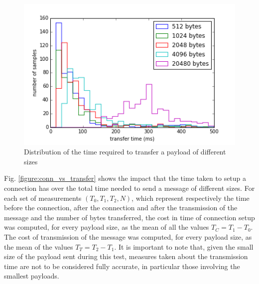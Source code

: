 \begin{figure}[ht!]
  \centering
  \includegraphics[width=1.0\textwidth]{application/img/transfer-time-distribution.png}
  \caption{Distribution of the time required to transfer a payload of different sizes}
  \label{figure:transfer_time_distribution}
\end{figure}

Fig. \ref{figure:conn_vs_transfer} shows the impact that the time taken to setup a connection has over the total time needed to send a message of different sizes.
For each set of measurements $(T_0, T_1, T_2, N)$, which represent respectively the time before the connection, after the connection and after the transmission of the message and the number of bytes transferred, the cost in time of connection setup was computed, for every payload size, as the mean of all the values $T_C = T_1 - T_0$.
The cost of transmission of the message was computed, for every payload size, as the mean of the values $T_T = T_2 - T_1$.
It is important to note that, given the small size of the payload sent during this test, measures taken about the transmission time are not to be considered fully accurate, in particular those involving the smallest payloads.

